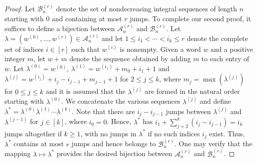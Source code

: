 \documentclass{article}
\theoremstyle{remark}
\theoremstyle{plain}
\begin{document}
\begin{proof}
Let $\mathcal{B}_n^{(r)}$ denote the set of nondecreasing integral sequences of length $n$ starting with 0 and containing at most $r$ jumps. To complete our second proof, it suffices to define a bijection between  $\mathcal{A}_n^{(r)}$ and  $\mathcal{B}_n^{(r)}$. Let $\lambda=(w^{(0)},\ldots,w^{(r)}) \in \mathcal{A}_n^{(r)}$ and let $1 \leq i_1<\cdots<i_k \leq r$ denote the complete set of indices $i \in [r]$ such that $w^{(i)}$ is nonempty.  Given a word $w$ and a positive integer $m$, let $w+m$ denote the sequence obtained by adding $m$ to each entry of $w$.  Let $\lambda^{(0)}=w^{(0)}$, $\lambda^{(1)}=w^{(i_1)}+m_0+i_1+1$ and $\lambda^{(j)}=w^{(i_j)}+i_j-i_{j-1}+m_{j-1}+1$ for $2 \leq j \leq k$, where $m_j=\max(\lambda^{(j)})$ for $0 \leq j \leq k$ and it is assumed that the $\lambda^{(j)}$ are formed in the natural order starting with $\lambda^{(0)}$. We concatenate the various sequences $\lambda^{(j)}$ and define $\lambda^*=\lambda^{(0)}\lambda^{(1)}\cdots\lambda^{(k)}$. Note that there are $i_j-i_{j-1}$ jumps between $\lambda^{(j)}$ and $\lambda^{(j-1)}$ for $j \in [k]$, where $i_0=0$.  Hence, $\lambda^*$ has $i_1+\sum_{j=2}^k(i_j-i_{j-1})=i_k$ jumps altogether if $k \geq 1$, with no jumps in $\lambda^*$ if no such indices $i_j$ exist.  Thus, $\lambda^*$ contains at most $r$ jumps and hence belongs to $\mathcal{B}_n^{(r)}$.  One may verify that the mapping $\lambda \mapsto \lambda^*$ provides the desired bijection between  $\mathcal{A}_n^{(r)}$ and  $\mathcal{B}_n^{(r)}$.
\end{proof}
\end{document}
